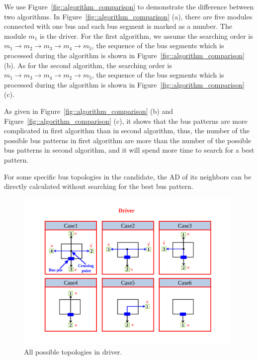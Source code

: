 We use Figure~\ref{fig::algorithm_comparison} to demonstrate the difference between two algorithms.
In Figure~\ref{fig::algorithm_comparison} (a), there are five modules connected with one bus and each bus segment is marked as a number.
The module $m_1$ is the driver. For the first algorithm, we assume the searching order is $m_1 \rightarrow m_2 \rightarrow m_3 \rightarrow m_4 \rightarrow m_5$,
the sequence of the bus segments which is processed during the algorithm is shown in Figure~\ref{fig::algorithm_comparison} (b).
As for the second algorithm, the searching order is $m_1 \rightarrow m_3 \rightarrow m_4 \rightarrow m_2 \rightarrow m_5$,
the sequence of the bus segments which is processed during the algorithm is shown in Figure~\ref{fig::algorithm_comparison} (c).

As given in Figure~\ref{fig::algorithm_comparison} (b) and Figure~\ref{fig::algorithm_comparison} (c),
it shows that the bus patterns are more complicated in first algorithm than in second algorithm, thus,
the number of the possible bus patterns in first algorithm are more than the number of the possible bus patterns in second algorithm,
and it will spend more time to search for a best pattern.

\begin{Lemma}
For some specific bus topologies in the candidate, the AD of its neighbors can be
directly calculated without searching for the best bus pattern.
\end{Lemma}

\begin{figure}[htb]
  \centering
    \includegraphics[width=11cm]{Fig/deviation_driver.pdf}
     \caption{
      All possible topologies in driver.
   }
  \label{fig::deviation_driver}
\end{figure}

